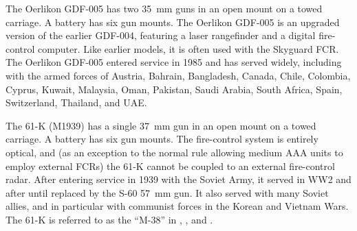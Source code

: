 \begin{withcounters}
    The Oerlikon GDF-005 has two 35~mm guns in an open mount on a towed carriage.
    A battery has six gun mounts.
    The Oerlikon GDF-005 is an upgraded version of the earlier GDF-004, featuring a laser rangefinder and a digital fire-control computer.
    Like earlier models, it is often used with the Skyguard FCR.
    The Oerlikon GDF-005 entered service in 1985 and has served widely, including with the armed forces of Austria, Bahrain, Bangladesh, Canada, Chile, Colombia, Cyprus, Kuwait, Malaysia, Oman, Pakistan, Saudi Arabia, South Africa, Spain, Switzerland, Thailand, and UAE.%


    The 61-K (M1939) has a single 37~mm gun in an open mount on a towed carriage.
    A battery has six gun mounts.
    The fire-control system is entirely optical, and (as an exception to the normal rule allowing medium AAA units to employ external FCRs) the 61-K cannot be coupled to an external fire-control radar.
    After entering service in 1939 with the Soviet Army, it served in WW2 and after until replaced by the S-60 57~mm gun. It also served with many Soviet allies, and in particular with communist forces in the Korean and Vietnam Wars.
    The 61-K is referred to as the “M-38” in {\AirStr}, {\EOTG}, and {\TSOH}.%
\end{withcounters}
